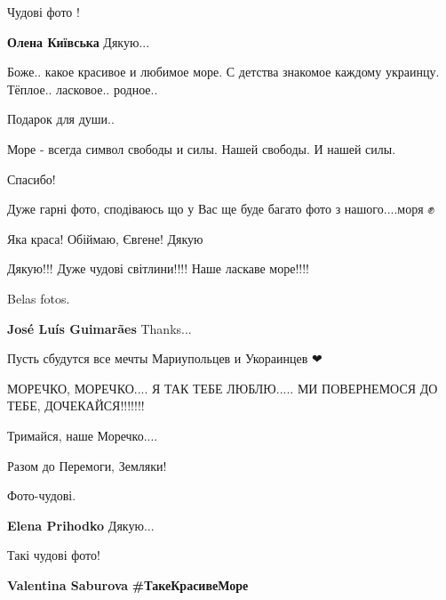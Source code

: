 \begin{multicols}{2}

Чудові фото ! 💖💖💖

\begin{itemize} %
\textbf{Олена Київська} Дякую...
\end{itemize} %


Боже.. какое красивое и любимое море. С детства знакомое каждому украинцу.
Тёплое.. ласковое.. родное..

Подарок для души..

Море - всегда символ свободы и силы. Нашей свободы. И нашей силы.

Спасибо!


Дуже гарні фото, сподіваюсь що у Вас ще буде багато фото з нашого....моря ✊


Яка краса! Обіймаю, Євгене! Дякую 🤗


Дякую!!! Дуже чудові світлини!!!! Наше ласкаве море!!!!


Belas fotos.

\begin{itemize} %
\textbf{José Luís Guimarães} Thanks...
\end{itemize} %


Пусть сбудутся все мечты Мариупольцев и Укораинцев ❤💙💛🇺🇦


МОРЕЧКО, МОРЕЧКО.... Я ТАК ТЕБЕ ЛЮБЛЮ..... МИ ПОВЕРНЕМОСЯ ДО ТЕБЕ, ДОЧЕКАЙСЯ!!!!!!!

Тримайся, наше Моречко....


Разом до Перемоги, Земляки!

Фото-чудові.

\textbf{Elena Prihodko} Дякую...


Такі чудові фото!

\begin{itemize} %
\textbf{Valentina Saburova} \textbf{\#ТакеКрасивеМоре}
\end{itemize} %



\end{multicols}

